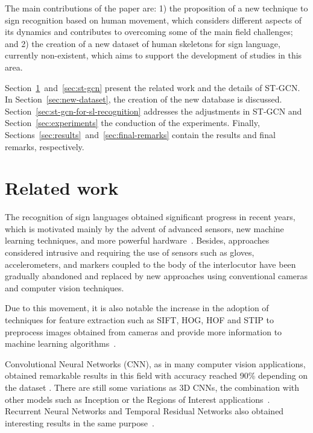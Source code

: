 The main contributions of the paper are: 1) the proposition of a new technique to sign recognition based on human movement, which considers different aspects of its dynamics and contributes to overcoming some of the main field challenges; and 2) the creation of a new dataset of human skeletons for sign language, currently non-existent, which aims to support the development of studies in this area.

Section~\ref{sec:related-work}~and~\ref{sec:st-gcn} present the related work and the details of ST-GCN. In Section~\ref{sec:new-dataset},  the creation of the new database is discussed.
Section~\ref{sec:st-gcn-for-sl-recognition} addresses the adjustments in ST-GCN and Section~\ref{sec:experiments} the conduction of the experiments. Finally, Sections~\ref{sec:results}~and~\ref{sec:final-remarks} contain the results and final remarks, respectively. 


\section{Related work}
\label{sec:related-work}

The recognition of sign languages obtained significant progress in recent years, which is motivated mainly by the advent of advanced sensors, new machine learning techniques, and more powerful hardware~\cite{recent-advances-dl-2017}. Besides, approaches considered intrusive and requiring the use of sensors such as gloves, accelerometers, and markers coupled to the body of the interlocutor have been gradually abandoned and replaced by new approaches using conventional cameras and computer vision techniques.

Due to this movement, it is also notable the increase in the adoption of techniques for feature extraction such as SIFT, HOG, HOF and STIP to preprocess images obtained from cameras and provide more information to machine learning algorithms~\cite{laptev-2008,lim-2016}.

Convolutional Neural Networks (CNN), as in many computer vision applications, obtained remarkable results in this field with accuracy reached 90\% depending on the dataset \cite{taskiran-2018,rao-2018}. There are still some variations as 3D CNNs, the combination with other models such as Inception or the Regions of Interest applications~\cite{elbadawy-2017,das-2018,sajanraj-2018}. Recurrent Neural Networks and Temporal Residual Networks also obtained interesting results in the same purpose~\cite{konstantinidis-2018,pigou-2017}.


